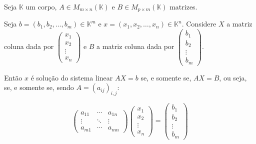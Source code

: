 \begin{proposition}
    Seja $\mathbb K$ um corpo, $A\in M_{m \times n}(\mathbb K)$ e $B\in M_{p \times m}(\mathbb K)$ matrizes.

    Seja $b=(b_1, b_2, \ldots, b_m)\in \mathbb K^m$ e $x=(x_1, x_2, \ldots, x_n)\in \mathbb K^n$. Considere $X$ a matriz coluna dada por $\begin{pmatrix}
        x_1 \\
        x_2 \\
        \vdots \\
        x_n
    \end{pmatrix}$ e $B$ a matriz coluna dada por $\begin{pmatrix}
        b_1 \\
        b_2 \\
        \vdots \\
        b_m
    \end{pmatrix}$.

    Então $x$ é solução do sistema linear $AX=b$ se, e somente se, $AX=B$, ou seja, se, e somente se, sendo $A=(a_{ij})_{i, j}$:

    \begin{equation*}
        \begin{pmatrix}
            a_{11}& \cdots & a_{1n} \\
            \vdots & \ddots & \vdots \\
            a_{m1} & \cdots & a_{mn}
        \end{pmatrix}
        \begin{pmatrix}
            x_1 \\
            x_2 \\
            \vdots \\
            x_n
        \end{pmatrix}
        =
        \begin{pmatrix}
            b_1 \\
            b_2 \\
            \vdots \\
            b_m
        \end{pmatrix}
    \end{equation*}
\end{proposition}

